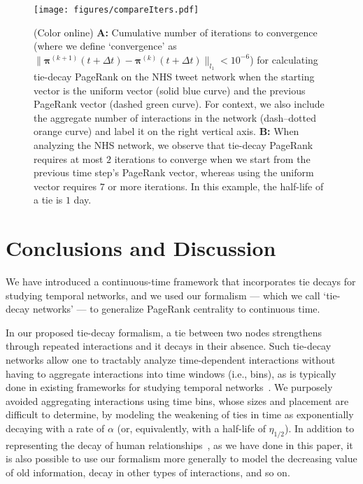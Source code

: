 \documentclass[journal,transmag]{IEEEtran}
\newcommand{\gvec}[1]{\bm{#1}}
\newcommand{\tdt}{t+\Delta t}
\newcommand{\vpi}{\gvec{\pi}}
\begin{document}
\begin{figure}[tp]
  \centerline{\texttt{[image: figures/compareIters.pdf]}}
  \caption{(Color online) {\bf A:} Cumulative number of iterations to
    convergence (where we define `convergence' as
    $\|\vpi^{\left(k+1\right)}(\tdt) -
    \vpi^{\left(k\right)}(\tdt)\|_{l_1} <10^{-6}$) for calculating tie-decay PageRank on the NHS tweet network when the starting
    vector is the uniform vector (solid blue curve) and the previous
    PageRank vector (dashed green curve). For context, we also include
    the aggregate number of interactions in the network
    (dash--dotted orange curve) and label it on the right vertical axis. {\bf B:} When
    analyzing the NHS network, we observe that tie-decay PageRank requires at
    most $2$ iterations to converge when we start from the previous
    time step's PageRank vector, whereas using the uniform vector requires $7$
    or more iterations. In this example, the half-life of a tie is $1$
    day.  
    }
  \label{fig:prsconv}
\end{figure}



\section{Conclusions and Discussion}\label{conclude}

We have introduced a continuous-time framework that incorporates tie
decays for studying temporal networks, and we used our formalism ---
which we call `tie-decay networks' --- to generalize PageRank
centrality to continuous time.

In our proposed tie-decay formalism, a tie between two nodes
strengthens through repeated interactions and it decays in their
absence. Such tie-decay networks allow one to tractably analyze
time-dependent interactions without having to aggregate interactions
into time windows (i.e., bins), as is typically done in existing frameworks for
studying temporal networks~\cite{holme2015modern,holme2019}. We purposely
avoided aggregating interactions using time bins, whose sizes and
placement are difficult to determine, by modeling the weakening of
ties in time as exponentially decaying with a rate of $\alpha$ (or,
equivalently, with a half-life of $\eta_{1/2}$). In addition to
representing the decay of human relationships~\cite{Burt2000}, as we
have done in this paper, it is also possible to use our formalism
more generally to model the decreasing value of old information, decay in
other types of interactions, and so on.
\end{document}
